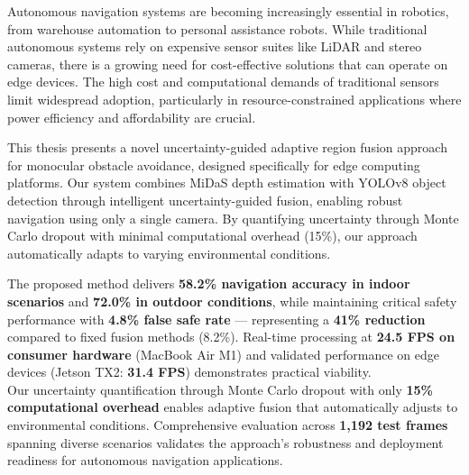 \documentclass[12pt,oneside]{book}
\makeatletter
\renewcommand{\figurename}{FIGURE}
\renewcommand{\thefigure}{\Roman{figure}}
\renewcommand{\fnum@figure}{\figurename~\thefigure}
\makeatother
\begin{document}
Autonomous navigation systems are becoming increasingly essential in robotics, from warehouse automation to personal assistance robots. While traditional autonomous systems rely on expensive sensor suites like LiDAR and stereo cameras, there is a growing need for cost-effective solutions that can operate on edge devices. The high cost and computational demands of traditional sensors limit widespread adoption, particularly in resource-constrained applications where power efficiency and affordability are crucial.

This thesis presents a novel uncertainty-guided adaptive region fusion approach for monocular obstacle avoidance, designed specifically for edge computing platforms. Our system combines MiDaS depth estimation with YOLOv8 object detection through intelligent uncertainty-guided fusion, enabling robust navigation using only a single camera. By quantifying uncertainty through Monte Carlo dropout with minimal computational overhead (15\%), our approach automatically adapts to varying environmental conditions.

\vspace{1cm}The proposed method delivers \textbf{58.2\% navigation accuracy in indoor scenarios} and \textbf{72.0\% in outdoor conditions}, while maintaining critical safety performance with \textbf{4.8\% false safe rate} — representing a \textbf{41\% reduction} compared to fixed fusion methods (8.2\%). Real-time processing at \textbf{24.5 FPS on consumer hardware} (MacBook Air M1) and validated performance on edge devices (Jetson TX2: \textbf{31.4 FPS}) demonstrates practical viability.
\\Our uncertainty quantification through Monte Carlo dropout with only \textbf{15\% computational overhead} enables adaptive fusion that automatically adjusts to environmental conditions. Comprehensive evaluation across \textbf{1,192 test frames} spanning diverse scenarios validates the approach's robustness and deployment readiness for autonomous navigation applications.

\clearpage


\tableofcontents
\clearpage

\renewcommand{\listfigurename}{LIST OF FIGURES}
\renewcommand{\figurename}{FIGURE}
\renewcommand{\thefigure}{\Roman{figure}}
\makeatletter
\renewcommand{\fnum@figure}{\figurename~\thefigure}
\makeatother

\listoffigures
\clearpage
\end{document}
